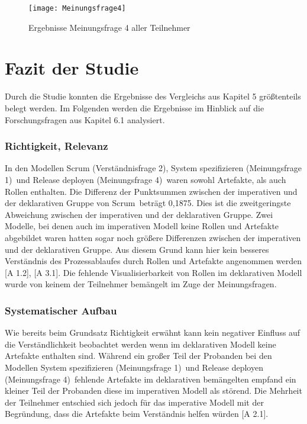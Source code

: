 \begin{figure}[htp]
\begin{center}
  \texttt{[image: Meinungsfrage4]} %
  \caption{Ergebnisse Meinungsfrage 4 aller Teilnehmer}
  \label{fig:Meinungsfrage4}
\end{center}
\end{figure}


\clearpage

\section{Fazit der Studie}

Durch die Studie konnten die Ergebnisse des Vergleichs aus Kapitel 5 größtenteils belegt werden. Im Folgenden werden die Ergebnisse im Hinblick auf die Forschungsfragen aus Kapitel 6.1 analysiert.\newline

\subsubsection{Richtigkeit, Relevanz}


In den Modellen \grqq Scrum (Verständnisfrage 2)\grqq, \grqq System spezifizieren (Meinungsfrage 1)\grqq \ und \grqq Release deployen (Meinungsfrage 4)\grqq \ waren sowohl Artefakte, als auch Rollen enthalten. Die Differenz der Punktsummen zwischen der imperativen und der deklarativen Gruppe von \grqq Scrum\grqq \ beträgt 0,1875. Dies ist die zweitgeringste Abweichung zwischen der imperativen und der deklarativen Gruppe. Zwei Modelle, bei denen auch im imperativen Modell keine Rollen und Artefakte abgebildet waren hatten sogar noch größere Differenzen zwischen der imperativen und der deklarativen Gruppe. Aus diesem Grund kann hier kein besseres Verständnis des Prozessablaufes durch Rollen und Artefakte angenommen werden [A 1.2], [A 3.1]. \newline
Die fehlende Visualisierbarkeit von Rollen im deklarativen Modell wurde von keinem der Teilnehmer bemängelt im Zuge der Meinungsfragen.\newline



\subsubsection{Systematischer Aufbau}

Wie bereits beim Grundsatz Richtigkeit erwähnt kann kein negativer Einfluss auf die Verständlichkeit beobachtet werden wenn im deklarativen Modell keine Artefakte enthalten sind.\newline
Während ein großer Teil der Probanden bei den Modellen \grqq System spezifizieren (Meinungsfrage 1)\grqq \ und \grqq Release deployen (Meinungsfrage 4)\grqq \ fehlende Artefakte im deklarativen bemängelten empfand ein kleiner Teil der Probanden diese im imperativen Modell als störend. Die Mehrheit der Teilnehmer entschied sich jedoch für das imperative Modell mit der Begründung, dass die Artefakte beim Verständnis helfen würden [A 2.1]. 

